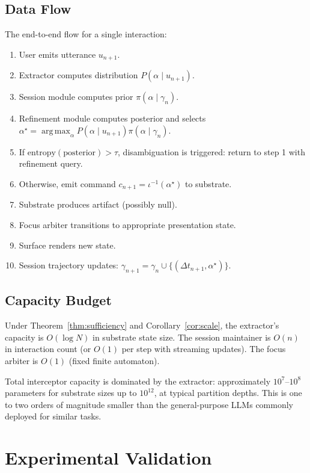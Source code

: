 \documentclass[11pt,a4paper]{article}
\theoremstyle{definition}
\theoremstyle{remark}
\DeclareMathOperator*{\argmax}{arg\,max}
\begin{document}
\subsection{Data Flow}

The end-to-end flow for a single interaction:

\begin{enumerate}
    \item User emits utterance $u_{n+1}$.
    \item Extractor computes distribution $P(\alpha \mid u_{n+1})$.
    \item Session module computes prior $\pi(\alpha \mid \gamma_n)$.
    \item Refinement module computes posterior and selects $\alpha^\star = \argmax_\alpha P(\alpha \mid u_{n+1}) \pi(\alpha \mid \gamma_n)$.
    \item If $\mathrm{entropy}(\text{posterior}) > \tau$, disambiguation is triggered: return to step 1 with refinement query.
    \item Otherwise, emit command $c_{n+1} = \iota^{-1}(\alpha^\star)$ to substrate.
    \item Substrate produces artifact (possibly null).
    \item Focus arbiter transitions to appropriate presentation state.
    \item Surface renders new state.
    \item Session trajectory updates: $\gamma_{n+1} = \gamma_n \cup \{(\Delta t_{n+1}, \alpha^\star)\}$.
\end{enumerate}

\subsection{Capacity Budget}

Under Theorem~\ref{thm:sufficiency} and Corollary~\ref{cor:scale}, the extractor's capacity is $O(\log N)$ in substrate state size. The session maintainer is $O(n)$ in interaction count (or $O(1)$ per step with streaming updates). The focus arbiter is $O(1)$ (fixed finite automaton).

Total interceptor capacity is dominated by the extractor: approximately $10^7$--$10^8$ parameters for substrate sizes up to $10^{12}$, at typical partition depths. This is one to two orders of magnitude smaller than the general-purpose LLMs commonly deployed for similar tasks.

\section{Experimental Validation}
\label{sec:validation}
\end{document}
